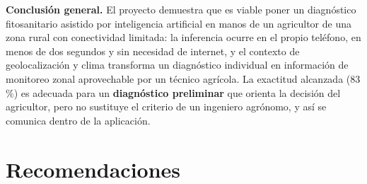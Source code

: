 \documentclass[12pt,a4paper]{article}
\begin{document}
\textbf{Conclusión general.} El proyecto demuestra que es viable poner un
diagnóstico fitosanitario asistido por inteligencia artificial en manos de un
agricultor de una zona rural con conectividad limitada: la inferencia ocurre en
el propio teléfono, en menos de dos segundos y sin necesidad de internet, y el
contexto de geolocalización y clima transforma un diagnóstico individual en
información de monitoreo zonal aprovechable por un técnico agrícola. La
exactitud alcanzada (83\,\%) es adecuada para un \textbf{diagnóstico preliminar}
que orienta la decisión del agricultor, pero no sustituye el criterio de un
ingeniero agrónomo, y así se comunica dentro de la aplicación.

\section{Recomendaciones}
\label{sec:recomendaciones}
\end{document}
